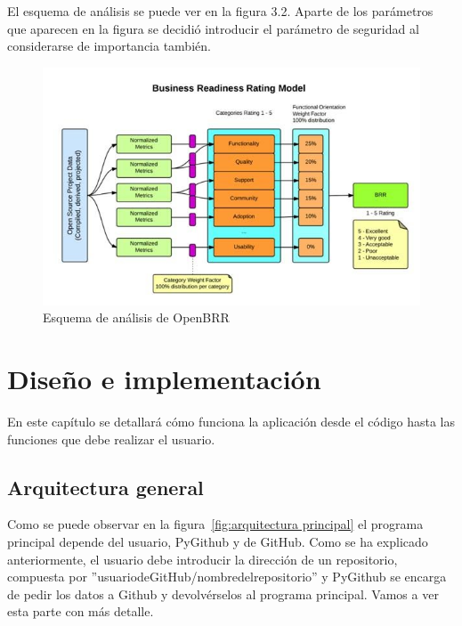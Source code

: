 \documentclass[a4paper, 12pt]{book}
\begin{document}
El esquema de análisis se puede ver en la figura 3.2. Aparte de los parámetros que aparecen en la figura se decidió introducir el parámetro de seguridad al considerarse de importancia también.

\begin{figure}
  \centering
  \includegraphics[width=14cm, keepaspectratio]{img/openbrr.png}
  \caption{Esquema de análisis de OpenBRR}\label{fig:OpenBRR}
\end{figure}



\cleardoublepage
\chapter{Diseño e implementación}
\label{chap:diseño}

En este capítulo se detallará cómo funciona la aplicación desde el código hasta las funciones que debe realizar el usuario.

\section{Arquitectura general} 
\label{sec:arquitectura}

Como se puede observar en la figura~\ref{fig:arquitectura principal} el programa principal depende del usuario, PyGithub y de GitHub. Como se ha explicado anteriormente, el usuario debe introducir la dirección de un repositorio, compuesta por ''usuario\textunderscore de\textunderscore GitHub/nombre\textunderscore del\textunderscore repositorio'' y PyGithub se encarga de pedir los datos a Github y devolvérselos al programa principal. Vamos a ver esta parte con más detalle.
\end{document}
